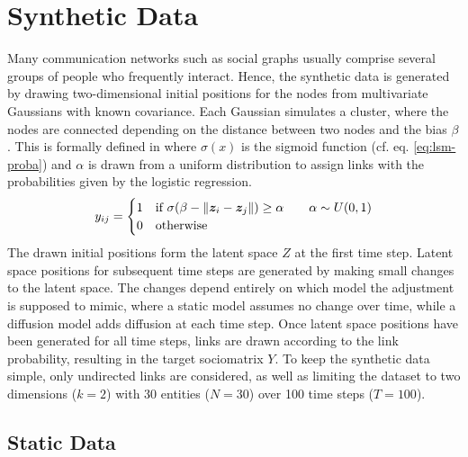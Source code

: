 \section{Synthetic Data}

Many communication networks such as social graphs usually comprise several groups of people who frequently interact. Hence, the synthetic data is generated by drawing two-dimensional initial positions for the nodes from multivariate Gaussians with known covariance. 
Each Gaussian simulates a cluster, where the nodes are connected depending on the distance between two nodes and the bias $\beta$. This is formally defined in  where $\sigma(x)$ is the sigmoid function (cf. eq. \ref{eq:lsm-proba}) and $\alpha$ is drawn from a uniform distribution to assign links with the probabilities given by the logistic regression.
\begin{equation}\label{eq:synth-link}
    \sub(y) = 
    \begin{cases}
        1 & \text{if } \sigma(\beta - \Vert\z_i - \z_j\Vert) \geq \alpha \qquad \alpha\sim U(0,1) \\
        0 & \text{otherwise}
    \end{cases}
\end{equation}
The drawn initial positions form the latent space $Z$ at the first time step. Latent space positions for subsequent time steps are generated by making small changes to the latent space. The changes depend entirely on which model the adjustment is supposed to mimic, where a static model assumes no change over time, while a diffusion model adds diffusion at each time step. Once latent space positions have been generated for all time steps, links are drawn according to the link probability, resulting in the target sociomatrix $Y$. To keep the synthetic data simple, only undirected links are considered, as well as limiting the dataset to two dimensions ($k=2$) with 30 entities ($N=30$) over 100 time steps ($T=100$).

\subsection{Static Data}

